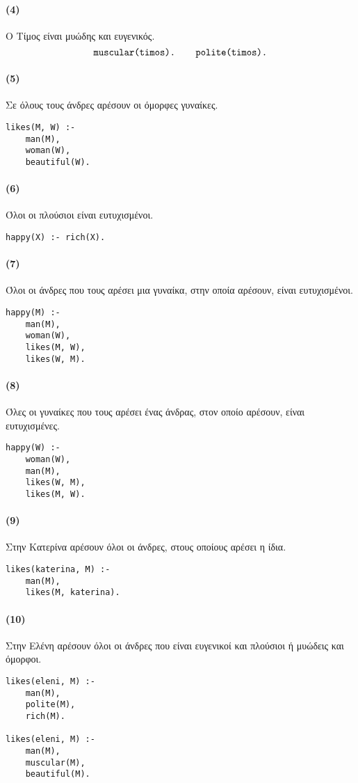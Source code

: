 \documentclass[a4paper,12pt]{article}
\begin{document}
\paragraph{(4)} Ο Τίμος είναι μυώδης και ευγενικός.
\[
\texttt{muscular(timos). \quad polite(timos).}
\]

\paragraph{(5)} Σε όλους τους άνδρες αρέσουν οι όμορφες γυναίκες.
\begin{verbatim}
likes(M, W) :-
    man(M),
    woman(W),
    beautiful(W).
\end{verbatim}

\paragraph{(6)} Όλοι οι πλούσιοι είναι ευτυχισμένοι.
\begin{verbatim}
happy(X) :- rich(X).
\end{verbatim}

\paragraph{(7)} Όλοι οι άνδρες που τους αρέσει μια γυναίκα, στην οποία αρέσουν, είναι ευτυχισμένοι.
\begin{verbatim}
happy(M) :-
    man(M),
    woman(W),
    likes(M, W),
    likes(W, M).
\end{verbatim}

\paragraph{(8)} Όλες οι γυναίκες που τους αρέσει ένας άνδρας, στον οποίο αρέσουν, είναι ευτυχισμένες.
\begin{verbatim}
happy(W) :-
    woman(W),
    man(M),
    likes(W, M),
    likes(M, W).
\end{verbatim}

\paragraph{(9)} Στην Κατερίνα αρέσουν όλοι οι άνδρες, στους οποίους αρέσει η ίδια.
\begin{verbatim}
likes(katerina, M) :-
    man(M),
    likes(M, katerina).
\end{verbatim}

\paragraph{(10)} Στην Ελένη αρέσουν όλοι οι άνδρες που είναι ευγενικοί και πλούσιοι ή μυώδεις και όμορφοι.
\begin{verbatim}
likes(eleni, M) :-
    man(M),
    polite(M),
    rich(M).

likes(eleni, M) :-
    man(M),
    muscular(M),
    beautiful(M).
\end{verbatim}
\end{document}
